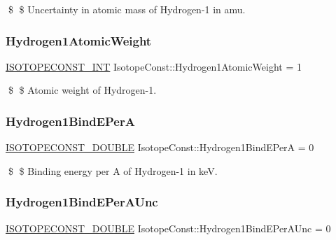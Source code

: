\$ \$ Uncertainty in atomic mass of Hydrogen-\/1 in amu. \mbox{\label{group___isotope_const-_hydrogen-_h1_gabd425e1807f636591385e3de882a99b7}} 
\subsubsection{\texorpdfstring{Hydrogen1\+Atomic\+Weight}{Hydrogen1AtomicWeight}}
{\footnotesize\ttfamily \mbox{\hyperlink{group___isotope_const-_macros_ga5f18360b3e99483a35c32d789e62621c}{I\+S\+O\+T\+O\+P\+E\+C\+O\+N\+S\+T\+\_\+\+I\+NT}} Isotope\+Const\+::\+Hydrogen1\+Atomic\+Weight = 1}

\$ \$ Atomic weight of Hydrogen-\/1. \mbox{\label{group___isotope_const-_hydrogen-_h1_gaacab34ee57f19d8eb89f8b7c202d3341}} 
\subsubsection{\texorpdfstring{Hydrogen1\+Bind\+E\+PerA}{Hydrogen1BindEPerA}}
{\footnotesize\ttfamily \mbox{\hyperlink{group___isotope_const-_macros_ga8f45a7272ce02c0b4c65c44636ed719a}{I\+S\+O\+T\+O\+P\+E\+C\+O\+N\+S\+T\+\_\+\+D\+O\+U\+B\+LE}} Isotope\+Const\+::\+Hydrogen1\+Bind\+E\+PerA = 0}

\$ \$ Binding energy per A of Hydrogen-\/1 in keV. \mbox{\label{group___isotope_const-_hydrogen-_h1_ga29a4cdf46aa0e542f62c434d7b9ca3d2}} 
\subsubsection{\texorpdfstring{Hydrogen1\+Bind\+E\+Per\+A\+Unc}{Hydrogen1BindEPerAUnc}}
{\footnotesize\ttfamily \mbox{\hyperlink{group___isotope_const-_macros_ga8f45a7272ce02c0b4c65c44636ed719a}{I\+S\+O\+T\+O\+P\+E\+C\+O\+N\+S\+T\+\_\+\+D\+O\+U\+B\+LE}} Isotope\+Const\+::\+Hydrogen1\+Bind\+E\+Per\+A\+Unc = 0}


